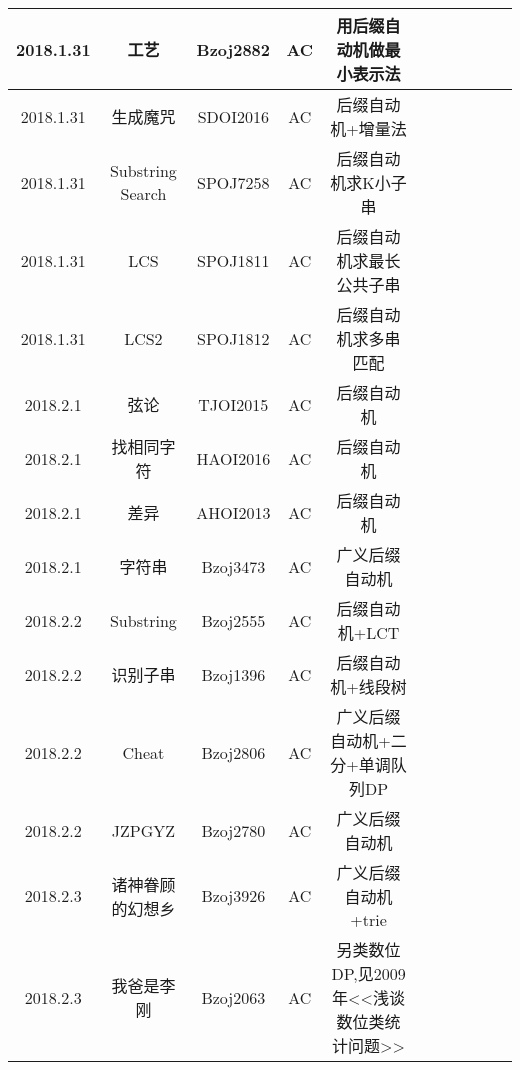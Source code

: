 \documentclass[landscape]{article}
\begin{document}
\begin{longtable}{ccccccccccc}
  \hline
  2018.1.31 & 工艺 & Bzoj2882 & AC & 用后缀自动机做最小表示法\\
  \hline
  2018.1.31 & 生成魔咒 & SDOI2016 & AC & 后缀自动机+增量法\\
  \hline
  2018.1.31 & Substring Search & SPOJ7258 & AC & 后缀自动机求K小子串\\
  \hline
  2018.1.31 & LCS & SPOJ1811 & AC & 后缀自动机求最长公共子串\\
  \hline
  2018.1.31 & LCS2 & SPOJ1812 & AC & 后缀自动机求多串匹配\\
  \hline
  2018.2.1 & 弦论 & TJOI2015 & AC & 后缀自动机\\
  \hline
  2018.2.1 & 找相同字符 & HAOI2016 & AC & 后缀自动机\\
  \hline
  2018.2.1 & 差异 & AHOI2013 & AC & 后缀自动机\\
  \hline
  2018.2.1 & 字符串 & Bzoj3473 & AC & 广义后缀自动机\\
  \hline
  2018.2.2 & Substring & Bzoj2555 & AC & 后缀自动机+LCT\\
  \hline
  2018.2.2 & 识别子串 & Bzoj1396 & AC & 后缀自动机+线段树\\
  \hline
  2018.2.2 & Cheat & Bzoj2806 & AC & 广义后缀自动机+二分+单调队列DP\\
  \hline
  2018.2.2 & JZPGYZ & Bzoj2780 & AC & 广义后缀自动机\\
  \hline
  2018.2.3 & 诸神眷顾的幻想乡 & Bzoj3926 & AC & 广义后缀自动机+trie\\
  \hline
  2018.2.3 & 我爸是李刚 & Bzoj2063 & AC & 另类数位DP,见2009年<<浅谈数位类统计问题>>\\
  \hline
  
\end{longtable}
\end{document}
